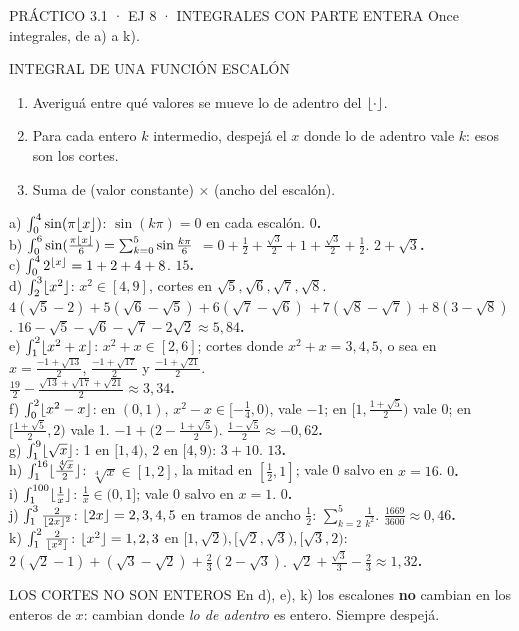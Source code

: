 \begin{enunciado}{PRÁCTICO 3.1 · EJ 8 · INTEGRALES CON PARTE ENTERA}
Once integrales, de a) a k).
\end{enunciado}
\begin{metodo}{INTEGRAL DE UNA FUNCIÓN ESCALÓN}
\begin{enumerate}
\item Averiguá entre qué valores se mueve lo de adentro del $\lfloor \cdot\rfloor$.
\item Para cada entero $k$ intermedio, despejá el $x$ donde lo de adentro vale $k$: esos son los cortes.
\item Suma de (valor constante) × (ancho del escalón).
\end{enumerate}
\end{metodo}
a) $\int_0^4\sin(\pi\lfloor x\rfloor)$: $\sin(k\pi)=0$ en cada escalón. \textbf{$0$.}\\[2pt]
b) $\int_0^6\sin(\frac{\pi\lfloor x\rfloor}6)=\sum_{k=0}^5\sin\frac{k\pi}6$ $=0+\frac12+\frac{\sqrt3}2+1+\frac{\sqrt3}2+\frac12$. \textbf{$2+\sqrt3$.}\\[2pt]
c) $\int_0^42^{\lfloor x\rfloor}=1+2+4+8$. \textbf{$15$.}\\[2pt]
d) $\int_2^3\lfloor x^2\rfloor$: $x^2\in[4,9]$, cortes en $\sqrt5,\sqrt6,\sqrt7,\sqrt8$. \\
$4(\sqrt5-2)+5(\sqrt6-\sqrt5)+6(\sqrt7-\sqrt6)$ $+\,7(\sqrt8-\sqrt7)+8(3-\sqrt8)$. \textbf{$16-\sqrt5-\sqrt6-\sqrt7-2\sqrt2\approx5{,}84$.}\\[2pt]
e) $\int_1^2\lfloor x^2+x\rfloor$: $x^2+x\in[2,6]$; cortes donde $x^2+x=3,4,5$, o sea en $x=\frac{-1+\sqrt{13}}2$, $\frac{-1+\sqrt{17}}2$ y $\frac{-1+\sqrt{21}}2$.\\
\textbf{$\frac{19}2-\frac{\sqrt{13}+\sqrt{17}+\sqrt{21}}2\approx3{,}34$.}\\[2pt]
f) $\int_0^2\lfloor x^2-x\rfloor$: en $(0,1)$, $x^2-x\in[-\frac14,0)$, vale $-1$; en $[1,\frac{1+\sqrt5}2)$ vale 0; en $[\frac{1+\sqrt5}2,2)$ vale 1. $-1+\big(2-\frac{1+\sqrt5}2\big)$. \textbf{$\frac{1-\sqrt5}2\approx-0{,}62$.}\\[2pt]
g) $\int_1^9\lfloor \sqrt x\rfloor$: 1 en $[1,4)$, 2 en $[4,9)$: $3+10$. \textbf{$13$.}\\[2pt]
h) $\int_1^{16}\lfloor \frac{\sqrt[4]x}2\rfloor$: $\sqrt[4]x\in[1,2]$, la mitad en $[\frac12,1]$; vale 0 salvo en $x=16$. \textbf{$0$.}\\[2pt]
i) $\int_1^{100}\lfloor \frac1x\rfloor$: $\frac1x\in(0,1]$; vale 0 salvo en $x=1$. \textbf{$0$.}\\[2pt]
j) $\int_1^3\frac2{\lfloor 2x\rfloor^2}$: $\lfloor 2x\rfloor=2,3,4,5$ en tramos de ancho $\frac12$: $\sum_{k=2}^5\frac1{k^2}$. \textbf{$\frac{1669}{3600}\approx0{,}46$.}\\[2pt]
k) $\int_1^2\frac2{\lfloor x^2\rfloor}$: $\lfloor x^2\rfloor=1,2,3$ en $[1,\sqrt2),[\sqrt2,\sqrt3),[\sqrt3,2)$: $2(\sqrt2-1)+(\sqrt3-\sqrt2)+\frac23(2-\sqrt3)$. \textbf{$\sqrt2+\frac{\sqrt3}3-\frac23\approx1{,}32$.}
\begin{trampa}{LOS CORTES NO SON ENTEROS}
En d), e), k) los escalones \textbf{no} cambian en los enteros de $x$: cambian donde \emph{lo de adentro} es entero. Siempre despejá.
\end{trampa}

